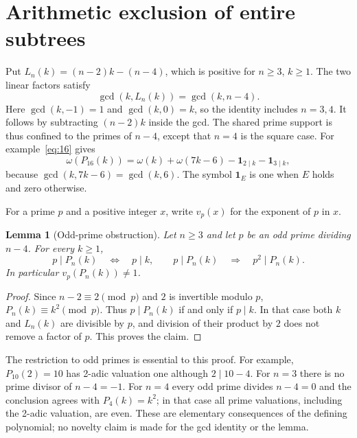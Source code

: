 \documentclass[11pt]{article}
\newtheorem{lemma}[theorem]{Lemma}
\theoremstyle{remark}
\begin{document}
\section{Arithmetic exclusion of entire subtrees}\label{sec:arithmetic}
Put $L_n(k)=(n-2)k-(n-4)$, which is positive for $n\geq3$, $k\geq1$.
The two linear factors satisfy
\begin{equation}\label{eq:gcd}
 \gcd(k,L_n(k))=\gcd(k,n-4).
\end{equation}
Here $\gcd(k,-1)=1$ and $\gcd(k,0)=k$, so the identity includes $n=3,4$.
It follows by subtracting $(n-2)k$ inside the gcd. The shared prime
support is thus confined to the primes of $n-4$, except that $n=4$ is the
square case. For example~\eqref{eq:16} gives
\begin{equation}\label{eq:support16}
 \omega(P_{16}(k))=\omega(k)+\omega(7k-6)
                  -\boldsymbol{1}_{2\mid k}-\boldsymbol{1}_{3\mid k},
\end{equation}
because $\gcd(k,7k-6)=\gcd(k,6)$. The symbol
$\boldsymbol{1}_{E}$ is one when $E$ holds and zero otherwise.

For a prime $p$ and a positive integer $x$, write $v_p(x)$ for the exponent
of $p$ in $x$.
\begin{lemma}[Odd-prime obstruction]\label{lem:valuation}
Let $n\geq3$ and let $p$ be an odd prime dividing $n-4$. For every $k\geq1$,
\begin{equation}\label{eq:noone}
 p\mid P_n(k)\quad\Longleftrightarrow\quad p\mid k,
 \qquad p\mid P_n(k)\quad\Longrightarrow\quad p^2\mid P_n(k).
\end{equation}
In particular $v_p(P_n(k))\ne1$.
\end{lemma}
\begin{proof}
Since $n-2\equiv2\pmod p$ and $2$ is invertible modulo $p$,
$P_n(k)\equiv k^2\pmod p$. Thus $p\mid P_n(k)$ if and only if $p\mid k$.
In that case both $k$ and $L_n(k)$ are divisible by $p$, and division of
their product by $2$ does not remove a factor of $p$. This proves the claim.
\end{proof}

The restriction to odd primes is essential to this proof. For example,
$P_{10}(2)=10$ has 2-adic valuation one although $2\mid10-4$.
For $n=3$ there is no prime divisor of $n-4=-1$. For $n=4$ every odd prime
divides $n-4=0$ and the conclusion agrees with $P_4(k)=k^2$; in that case
all prime valuations, including the 2-adic valuation, are even. These are
elementary consequences of the defining polynomial; no novelty claim is
made for the gcd identity or the lemma.
\end{document}
